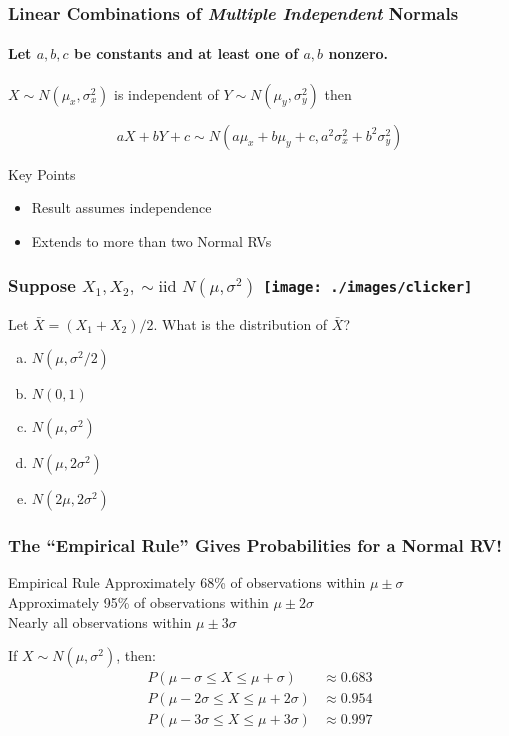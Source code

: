 \begin{frame}
  \frametitle{Linear Combinations of \emph{Multiple Independent} Normals}
  \framesubtitle{Let $a,b,c$ be constants and at least one of $a,b$ nonzero.} 

$X \sim N(\mu_x, \sigma^2_x)$ is independent of $Y \sim N(\mu_y, \sigma^2_y)$ then

$$\boxed{aX + bY +c \sim N(a\mu_x + b\mu_y + c, a^2 \sigma_x^2 + b^2 \sigma_y^2)}$$



\begin{alertblock}{Key Points}
	\begin{itemize}
		\item Result assumes independence
		\item Extends to more than two Normal RVs
	\end{itemize}
\end{alertblock}

\end{frame}
\begin{frame}
\frametitle{Suppose $X_1, X_2, \sim \mbox{iid } N(\mu, \sigma^2)$ \hfill \texttt{[image: ./images/clicker]}}

Let $\bar{X} = (X_1 + X_2)/2$. What is the distribution of $\bar{X}$?
\begin{enumerate}[(a)]
\item $N(\mu, \sigma^2/2)$
\item $N(0,1)$
\item $N(\mu, \sigma^2)$
\item $N(\mu, 2\sigma^2)$
\item $N(2\mu, 2\sigma^2)$
\end{enumerate}

\end{frame}
\begin{frame}
\frametitle{The ``Empirical Rule'' Gives Probabilities for a Normal RV!}

\begin{block}{Empirical Rule}
Approximately 68\% of observations within $\mu\pm \sigma$\\
Approximately 95\% of observations within $\mu\pm 2 \sigma$\\
Nearly all observations within $\mu\pm 3 \sigma$
\end{block}

\vspace{1em}

\begin{alertblock}{If $X \sim N(\mu, \sigma^2)$, then:}
  \vspace{-3em}
  \begin{align*}
    P(\mu - \sigma \leq X \leq \mu + \sigma) &\approx 0.683\\
  P(\mu - 2\sigma \leq X \leq \mu + 2\sigma) &\approx 0.954\\
  P(\mu - 3\sigma \leq X \leq \mu + 3\sigma) &\approx 0.997
  \end{align*}
\end{alertblock}

\end{frame}

